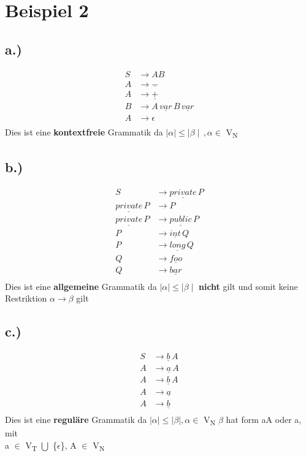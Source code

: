 \documentclass[12pt,runningheads,a4paper]{llncs}
\begin{document}
\section*{Beispiel 2}

\subsection*{a.)}

\begin{align*}
S &\rightarrow AB \\
A &\rightarrow \underline{-} \\
A &\rightarrow \underline{+} \\
B &\rightarrow A \, \underline{var}\, B  \, \underline{var} \\
A &\rightarrow \epsilon \\
\end{align*}
Dies ist eine \textbf{kontextfreie} Grammatik da  $\mid\alpha\mid \leq \mid\beta\mid\, , \alpha \in$ V\textsubscript{N}
 


\subsection*{b.)}
\begin{align*}
S &\rightarrow \underline{private}\, P \\
\underline{private}\, P &\rightarrow P \\
\underline{private}\, P &\rightarrow \underline{public}\, P \\
P &\rightarrow \underline{int}\, Q \\
P &\rightarrow \underline{long}\, Q \\
Q &\rightarrow \underline{foo} \\
Q &\rightarrow \underline{bar}\\
\end{align*}
Dies ist eine \textbf{allgemeine} Grammatik da $ \mid\alpha\mid \leq \mid\beta\mid$ \textbf{nicht} gilt und somit keine Restriktion $\alpha \rightarrow \beta$  gilt 

\subsection*{c.)}
\begin{align*}
S &\rightarrow \underline{b}\, A \\
A &\rightarrow \underline{a}\, A \\
A &\rightarrow \underline{b}\, A \\
A &\rightarrow \underline{a}\\
A &\rightarrow \underline{b}\\
\end{align*}
Dies ist eine \textbf{reguläre} Grammatik da $ \mid\alpha\mid \leq \mid\beta\mid , \alpha \in$ V\textsubscript{N} 
$\beta$ hat form aA oder a, mit \\a $\in$ V\textsubscript{T} $\bigcup$ \{$\epsilon$\}, A $\in$ V\textsubscript{N}
\end{document}
